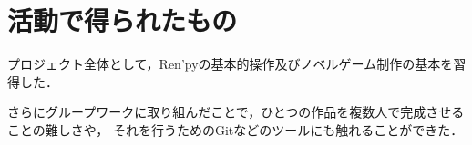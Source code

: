 \section{活動で得られたもの}
  プロジェクト全体として，Ren'pyの基本的操作及びノベルゲーム制作の基本を習得した．
 
  さらにグループワークに取り組んだことで，ひとつの作品を複数人で完成させることの難しさや，
  それを行うためのGitなどのツールにも触れることができた．
